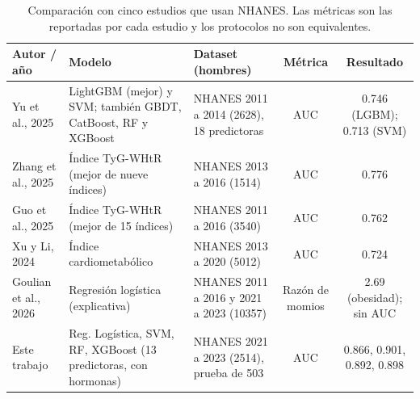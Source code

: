 \documentclass[conference]{IEEEtran}
\begin{document}
\begin{table}[!t]
\centering
\footnotesize
\caption{Comparación con cinco estudios que usan NHANES. Las métricas son las reportadas por cada estudio y los protocolos no son equivalentes.}
\label{tab:sota}
\begin{tabular}{l p{4.2cm} p{4.2cm} c c}
\toprule
Autor / año & Modelo & Dataset (hombres) & Métrica & Resultado \\
\midrule
Yu et al., 2025 \cite{yu2025} & LightGBM (mejor) y SVM; también GBDT, CatBoost, RF y XGBoost & NHANES 2011 a 2014 (2628), 18 predictoras & AUC & 0.746 (LGBM); 0.713 (SVM) \\
Zhang et al., 2025 \cite{zhang2025} & Índice TyG-WHtR (mejor de nueve índices) & NHANES 2013 a 2016 (1514) & AUC & 0.776 \\
Guo et al., 2025 \cite{guo2025} & Índice TyG-WHtR (mejor de 15 índices) & NHANES 2011 a 2016 (3540) & AUC & 0.762 \\
Xu y Li, 2024 \cite{xu2024} & Índice cardiometabólico & NHANES 2013 a 2020 (5012) & AUC & 0.724 \\
Goulian et al., 2026 \cite{goulian2026} & Regresión logística (explicativa) & NHANES 2011 a 2016 y 2021 a 2023 (10357) & Razón de momios & 2.69 (obesidad); sin AUC \\
\midrule
Este trabajo & Reg. Logística, SVM, RF, XGBoost (13 predictoras, con hormonas) & NHANES 2021 a 2023 (2514), prueba de 503 & AUC & 0.866, 0.901, 0.892, 0.898 \\
\bottomrule
\end{tabular}
\end{table}
\end{document}
